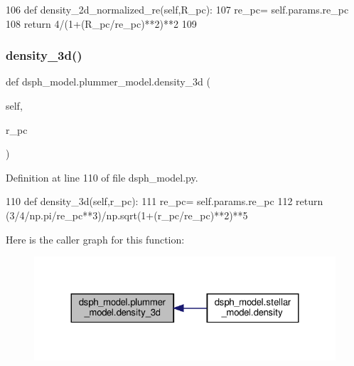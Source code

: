 \begin{DoxyCode}
106     \textcolor{keyword}{def }density\_2d\_normalized\_re(self,R\_pc):
107         re\_pc= self.params.re\_pc
108         \textcolor{keywordflow}{return} 4/(1+(R\_pc/re\_pc)**2)**2
109       
\end{DoxyCode}
\mbox{\label{classdsph__model_1_1plummer__model_ab60395efc8859c48ca5643e54f7e65be}} 
\subsubsection{\texorpdfstring{density\+\_\+3d()}{density\_3d()}}
{\footnotesize\ttfamily def dsph\+\_\+model.\+plummer\+\_\+model.\+density\+\_\+3d (\begin{DoxyParamCaption}\item[{}]{self,  }\item[{}]{r\+\_\+pc }\end{DoxyParamCaption})}



Definition at line 110 of file dsph\+\_\+model.\+py.


\begin{DoxyCode}
110     \textcolor{keyword}{def }density\_3d(self,r\_pc):
111         re\_pc= self.params.re\_pc
112         \textcolor{keywordflow}{return} (3/4/np.pi/re\_pc**3)/np.sqrt(1+(r\_pc/re\_pc)**2)**5
\end{DoxyCode}
Here is the caller graph for this function\+:\nopagebreak
\begin{figure}[H]
\begin{center}
\leavevmode
\includegraphics[width=324pt]{d4/d46/classdsph__model_1_1plummer__model_ab60395efc8859c48ca5643e54f7e65be_icgraph}
\end{center}
\end{figure}
\mbox{\label{classdsph__model_1_1plummer__model_a17a85f2954201bcef154bbc65c7794fc}} 
